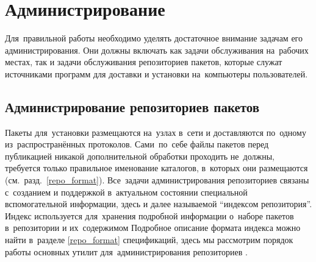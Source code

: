 
\section{Администрирование \ds}

Для~правильной работы \ds необходимо уделять достаточное внимание задачам его администрирования.
Они должны включать как задачи обслуживания \ds на~рабочих местах, так и задачи обслуживания репозиториев пакетов,
которые служат источниками программ для доставки и установки на~компьютеры пользователей.

\subsection{Администрирование репозиториев пакетов}

Пакеты для~установки размещаются на~узлах в~сети и доставляются по~одному из~распространённых протоколов.
Сами~по~себе файлы пакетов перед публикацией никакой дополнительной обработки проходить не~должны,
требуется только правильное именование каталогов, в~которых они размещаются (см.~разд.~\ref{repo_format}).
Все~задачи администрирования репозиториев связаны с~созданием и поддержкой в~актуальном состоянии специальной вспомогательной информации,
здесь и далее называемой ``индексом  репозитория''.
Индекс используется для~хранения подробной информации о~наборе пакетов в~репозитории и их~содержимом
Подробное описание формата индекса можно найти в~разделе \ref{repo_format} спецификаций,
здесь мы рассмотрим порядок работы основных утилит для~администрирования репозиториев \ds.

